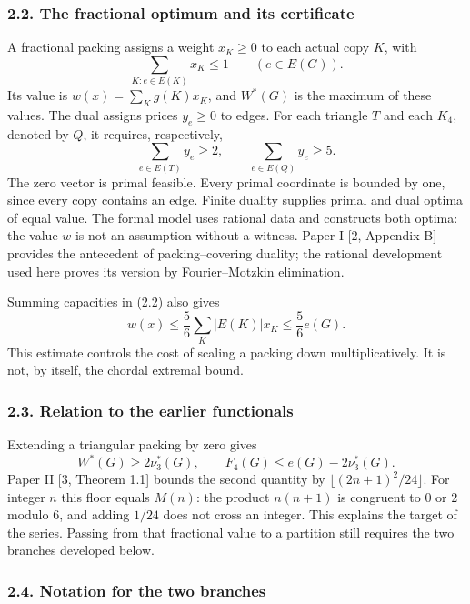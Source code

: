 \documentclass[english,11pt,a4paper]{article}
\begin{document}
\subsubsection{2.2. The fractional optimum and its certificate}\label{the-fractional-optimum-and-its-certificate}

A fractional packing assigns a weight \(x_K\ge0\) to each actual copy \(K\), with \[
\sum_{K:e\in E(K)}x_K\le1\qquad(e\in E(G)).
\tag{2.2}
\] Its value is \(w(x)=\sum_K g(K)x_K\), and \(W^*(G)\) is the maximum of these values. The dual assigns prices \(y_e\ge0\) to edges. For each triangle \(T\) and each \(K_4\), denoted by \(Q\), it requires, respectively, \[
\sum_{e\in E(T)}y_e\ge2,\qquad
\sum_{e\in E(Q)}y_e\ge5.
\tag{2.3}
\] The zero vector is primal feasible. Every primal coordinate is bounded by one, since every copy contains an edge. Finite duality supplies primal and dual optima of equal value. The formal model uses rational data and constructs both optima: the value \(w\) is not an assumption without a witness. Paper I {[}2, Appendix B{]} provides the antecedent of packing--covering duality; the rational development used here proves its version by Fourier--Motzkin elimination.

Summing capacities in (2.2) also gives \[
w(x)\le\frac56\sum_K |E(K)|x_K\le\frac56e(G).
\tag{2.4}
\] This estimate controls the cost of scaling a packing down multiplicatively. It is not, by itself, the chordal extremal bound.

\subsubsection{2.3. Relation to the earlier functionals}\label{relation-to-the-earlier-functionals}

Extending a triangular packing by zero gives \[
W^*(G)\ge2\nu_3^*(G),\qquad
F_4(G)\le e(G)-2\nu_3^*(G).
\tag{2.5}
\] Paper II {[}3, Theorem 1.1{]} bounds the second quantity by \(\lfloor(2n+1)^2/24\rfloor\). For integer \(n\) this floor equals \(M(n)\): the product \(n(n+1)\) is congruent to 0 or 2 modulo 6, and adding \(1/24\) does not cross an integer. This explains the target of the series. Passing from that fractional value to a partition still requires the two branches developed below.

\subsubsection{2.4. Notation for the two branches}\label{notation-for-the-two-branches}
\end{document}
